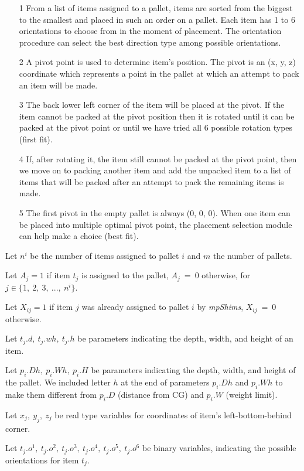 \documentclass[preprint,authoryear]{elsarticle}
\begin{document}
\begin{itemize}
	\item[1] From a list of items assigned to a pallet, items are sorted from the biggest to the smallest and placed in such an order on a pallet. Each item has 1 to 6 orientations to choose from in the moment of placement. The orientation procedure can select the best direction type among possible orientations.
	\item[2] A pivot point is used to determine item's position. The pivot is an (x, y, z) coordinate which represents a point in the pallet at which an attempt to pack an item will be made.
	\item[3] The back lower left corner of the item will be placed at the pivot. If the item cannot be packed at the pivot position then it is rotated until it can be packed at the pivot point or until we have tried all 6 possible rotation types (first fit).
	\item[4] If, after rotating it, the item still cannot be packed at the pivot point, then we move on to packing another item and add the unpacked item to a list of items that will be packed after an attempt to pack the remaining items is made.
	\item[5] The first pivot in the empty pallet is always (0, 0, 0). When one item can be placed into multiple optimal pivot point, the placement selection module can help make a choice (best fit).
\end{itemize}

Let $n^i$ be the number of items assigned to pallet $i$ and $m$ the number of pallets.

Let $A_{j} = 1$ if item $t_j$ is assigned to the pallet, $A_{j}\ =\ 0$ otherwise, for $j \in \{1,\ 2,\ 3,\ ...,\ n^i\}$.

Let $X_{ij} = 1$ if item $j$ was already assigned to pallet $i$ by {\it mpShims}, $X_{ij}\ =\ 0$ otherwise.

Let $t_j.d,\ t_j.wh,\ t_j.h$ be parameters indicating the depth, width, and height of an item.

Let $p_i.Dh,\ p_i.Wh,\ p_i.H$ be parameters indicating the depth, width, and height of the pallet. We included letter $h$ at the end of parameters $p_i.Dh$ and $p_i.Wh$ to make them different from $p_i.D$ (distance from CG) and $p_i.W$ (weight limit).

Let $x_j,\ y_j,\ z_j$ be real type variables for coordinates of item's left-bottom-behind corner.

Let $t_j.o^1,\ t_j.o^2,\ t_j.o^3,\ t_j.o^4,\ t_j.o^5,\ t_j.o^6$ be binary variables, indicating the possible orientations for item $t_j$.
\end{document}
